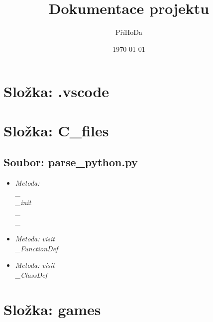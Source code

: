\documentclass{article}
\begin{document}
\title{Dokumentace projektu}
\author{PříHoDa}
\date{\today}
\maketitle
\section*{Složka: .vscode}
\section*{Složka: C\_files}
\subsection*{Soubor: parse_python.py}
\begin{itemize}
 \subsection*{Třída: CommentExtractor}
\item \textit{Metoda: \\_\\_init\\_\\_}
\item \textit{Metoda: visit\\_FunctionDef}
\item \textit{Metoda: visit\\_ClassDef}
\end{itemize}
\section*{Složka: games}
\end{document}
